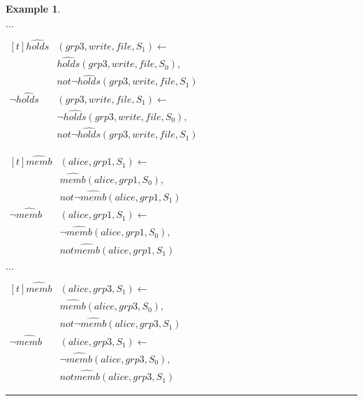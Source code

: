 \documentclass[11pt, twocolumn]{article}
\newtheorem{vexmpl}{Example}
\newenvironment{vexample}
  {\begin{vexmpl}\rm}
  {\rule{2mm}{2mm}\end{vexmpl}}
\begin{document}
\begin{vexample}
\begin{enumerate}
              \hspace{1cm} $\ldots$

              \begin{math}
                \begin{aligned}[t]
                  \hat{holds}&(grp3, write, file, S_{1}) \leftarrow \\
                  & \hat{holds}(grp3, write, file, S_{0}), \\
                  & not \lnot \hat{holds}(grp3, write, file, S_{1}) \\
                  \lnot \hat{holds}&(grp3, write, file, S_{1}) \leftarrow \\
                  & \lnot \hat{holds}(grp3, write, file, S_{0}), \\
                  & not \lnot \hat{holds}(grp3, write, file, S_{1})
                \end{aligned}
              \end{math}

              \begin{math}
                \begin{aligned}[t]
                  \hat{memb}&(alice, grp1, S_{1}) \leftarrow \\
                  & \hat{memb}(alice, grp1, S_{0}), \\
                  & not \lnot \hat{memb}(alice, grp1, S_{1}) \\
                  \lnot \hat{memb}&(alice, grp1, S_{1}) \leftarrow \\
                  & \lnot \hat{memb}(alice, grp1, S_{0}), \\
                  & not \hat{memb}(alice, grp1, S_{1})
                \end{aligned}
              \end{math}

              \hspace{1cm} $\ldots$

              \begin{math}
                \begin{aligned}[t]
                  \hat{memb}&(alice, grp3, S_{1}) \leftarrow \\
                  & \hat{memb}(alice, grp3, S_{0}), \\
                  & not \lnot \hat{memb}(alice, grp3, S_{1}) \\
                  \lnot \hat{memb}&(alice, grp3, S_{1}) \leftarrow \\
                  & \lnot \hat{memb}(alice, grp3, S_{0}), \\
                  & not \hat{memb}(alice, grp3, S_{1})
                \end{aligned}
              \end{math}


\end{enumerate}
\end{vexample}
\end{document}
